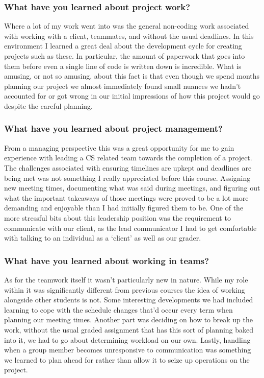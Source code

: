 \documentclass[article, onecolumn, draftclsnofoot,10pt, compsoc]{IEEEtran}
\begin{document}
\subsubsection{What have you learned about project work?}
Where a lot of my work went into was the general non-coding work associated with working with a client, teammates, and without the usual deadlines. In this environment I learned a great deal about the development cycle for creating projects such as these. In particular, the amount of paperwork that goes into them before even a single line of code is written down is incredible. What is amusing, or not so amusing, about this fact is that even though we spend months planning our project we almost immediately found small nuances we hadn’t accounted for or got wrong in our initial impressions of how this project would go despite the careful planning.

\subsubsection{What have you learned about project management?}
From a managing perspective this was a great opportunity for me to gain experience with leading a CS related team towards the completion of a project. The challenges associated with ensuring timelines are upkept and deadlines are being met was not something I really appreciated before this course. Assigning new meeting times, documenting what was said during meetings, and figuring out what the important takeaways of those meetings were proved to be a lot more demanding and enjoyable than I had initially figured them to be. One of the more stressful bits about this leadership position was the requirement to communicate with our client, as the lead communicator I had to get comfortable with talking to an individual as a ‘client’ as well as our grader.

\subsubsection{What have you learned about working in teams?}
As for the teamwork itself it wasn’t particularly new in nature. While my role within it was significantly different from previous courses the idea of working alongside other students is not. Some interesting developments we had included learning to cope with the schedule changes that’d occur every term when planning our meeting times. Another part was deciding on how to break up the work, without the usual graded assignment that has this sort of planning baked into it, we had to go about determining workload on our own. Lastly, handling when a group member becomes unresponsive to communication was something we learned to plan ahead for rather than allow it to seize up operations on the project.
\end{document}
